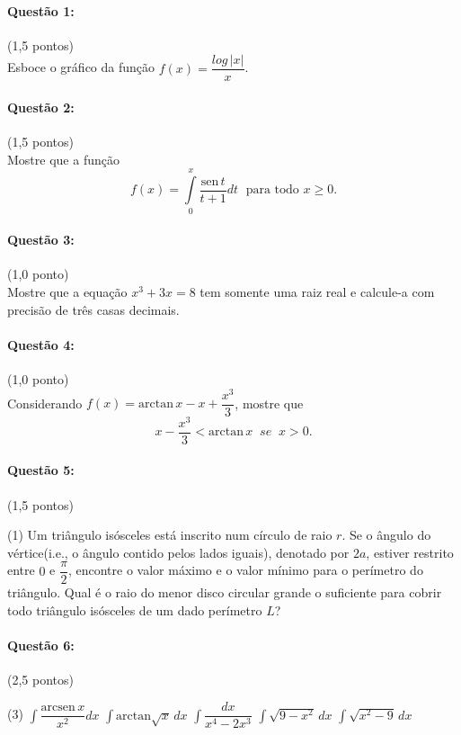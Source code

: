 \documentclass[12pt,a4paper]{article}
\begin{document}
\paragraph{Questão 1:}(1,5 pontos)\\
Esboce o gráfico da função $f(x)=\dfrac{log\,|x|}{x}$.

\paragraph{Questão 2:}(1,5 pontos)\\
Mostre que a função
$$f(x)=\displaystyle\int\limits_{0}^{x}\dfrac{\mathrm{sen}\,t}{t+1}dt\;\text{ para todo }x\geq 0.$$
\paragraph{Questão 3:}(1,0 ponto)\\
Mostre que a equação $x^3+3x=8$ tem somente uma raiz real e calcule-a com precisão de três casas decimais.

\paragraph{Questão 4:}(1,0 ponto)\\
Considerando $f(x)=\mathrm{arctan}\,x-x+\dfrac{x^3}{3}$, mostre que
$$x-\dfrac{x^3}{3}<\mathrm{arctan}\,x\;\;se\;\;x>0.$$

\paragraph{Questão 5:}(1,5 pontos)

\begin{tasks}(1)
\task Um triângulo isósceles está inscrito num círculo de raio $r$. Se o ângulo do vértice(i.e., o ângulo contido pelos lados iguais), denotado por $2a$, estiver restrito entre $0$ e $\dfrac{\pi}{2}$, encontre o valor máximo e o valor mínimo para o perímetro do triângulo.
\task Qual é o raio do menor disco circular grande o suficiente para cobrir todo triângulo isósceles de um dado perímetro $L$?
\end{tasks}
\paragraph{Questão 6:}(2,5 pontos)

\begin{tasks}(3)
\task $\displaystyle\int\dfrac{\mathrm{arcsen}\,x}{x^2}dx$
\task $\displaystyle\int\mathrm{arctan}\sqrt{x}\,dx$
\task $\displaystyle\int \dfrac{dx}{x^4-2x^3}$
\task $\displaystyle\int\sqrt{9-x^2}\,dx$
\task $\displaystyle\int\sqrt{x^2-9}\,dx$
\end{tasks}
\end{document}

